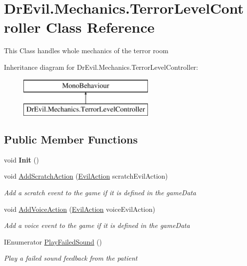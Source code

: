 \hypertarget{class_dr_evil_1_1_mechanics_1_1_terror_level_controller}{}\section{Dr\+Evil.\+Mechanics.\+Terror\+Level\+Controller Class Reference}
\label{class_dr_evil_1_1_mechanics_1_1_terror_level_controller}


This Class handles whole mechanics of the terror room  


Inheritance diagram for Dr\+Evil.\+Mechanics.\+Terror\+Level\+Controller\+:\begin{figure}[H]
\begin{center}
\leavevmode
\includegraphics[height=2.000000cm]{class_dr_evil_1_1_mechanics_1_1_terror_level_controller}
\end{center}
\end{figure}
\subsection*{Public Member Functions}
\begin{DoxyCompactItemize}
\item 
\mbox{\label{class_dr_evil_1_1_mechanics_1_1_terror_level_controller_a7e2676666d6e8bf3a853ebafc694f31e}} 
void {\bfseries Init} ()
\item 
void \mbox{\hyperlink{class_dr_evil_1_1_mechanics_1_1_terror_level_controller_a8d383e0849fbd683b2032658a751a783}{Add\+Scratch\+Action}} (\mbox{\hyperlink{class_evil_action}{Evil\+Action}} scratch\+Evil\+Action)
\begin{DoxyCompactList}\small\item\em Add a scratch event to the game if it is defined in the game\+Data \end{DoxyCompactList}\item 
void \mbox{\hyperlink{class_dr_evil_1_1_mechanics_1_1_terror_level_controller_a4c48f71b3f4881fd082d2a823aa19464}{Add\+Voice\+Action}} (\mbox{\hyperlink{class_evil_action}{Evil\+Action}} voice\+Evil\+Action)
\begin{DoxyCompactList}\small\item\em Add a voice event to the game if it is defined in the game\+Data \end{DoxyCompactList}\item 
I\+Enumerator \mbox{\hyperlink{class_dr_evil_1_1_mechanics_1_1_terror_level_controller_a0ababae78433f3aed00a7a871f3526fc}{Play\+Failed\+Sound}} ()
\begin{DoxyCompactList}\small\item\em Play a failed sound feedback from the patient \end{DoxyCompactList}\end{DoxyCompactItemize}
